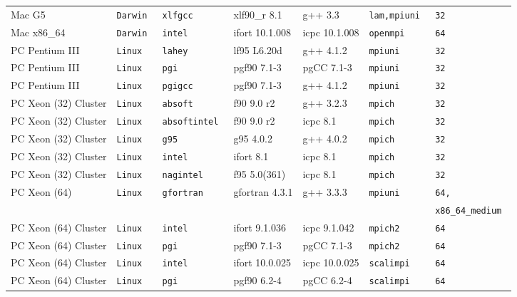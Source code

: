 \begin{tabular}{lllllll}
Mac G5          &\tt Darwin &\tt xlfgcc  & xlf90\_r \footnotesize 8.1& g++ \footnotesize 3.3    &\tt lam,mpiuni &\tt 32 \\
Mac x86\_64      &\tt Darwin &\tt intel   & ifort \footnotesize 10.1.008 & icpc \footnotesize 10.1.008 &\tt openmpi &\tt 64 \\
PC Pentium III  &\tt Linux  &\tt lahey   & lf95 \footnotesize L6.20d & g++ \footnotesize 4.1.2  &\tt mpiuni     &\tt 32 \\
PC Pentium III  &\tt Linux  &\tt pgi     & pgf90 \footnotesize 7.1-3 & pgCC \footnotesize 7.1-3 &\tt mpiuni     &\tt 32 \\
PC Pentium III  &\tt Linux  &\tt pgigcc  & pgf90 \footnotesize 7.1-3 & g++ \footnotesize 4.1.2  &\tt mpiuni     &\tt 32 \\
PC Xeon (32) Cluster &\tt Linux  &\tt absoft & f90 \footnotesize 9.0 r2 & g++ \footnotesize 3.2.3 &\tt mpich      &\tt 32 \\
PC Xeon (32) Cluster &\tt Linux  &\tt absoftintel & f90 \footnotesize 9.0 r2    & icpc \footnotesize 8.1      &\tt mpich     &\tt 32 \\
PC Xeon (32) Cluster &\tt Linux  &\tt g95         & g95 \footnotesize 4.0.2     & g++  \footnotesize 4.0.2    &\tt mpich     &\tt 32 \\
PC Xeon (32) Cluster &\tt Linux  &\tt intel       & ifort \footnotesize 8.1     & icpc \footnotesize 8.1      &\tt mpich     &\tt 32 \\
PC Xeon (32) Cluster &\tt Linux  &\tt nagintel    & f95 \footnotesize 5.0(361)  & icpc \footnotesize 8.1      &\tt mpich     &\tt 32 \\
PC Xeon (64)         &\tt Linux  &\tt gfortran    & gfortran \footnotesize 4.3.1& g++  \footnotesize 3.3.3  &\tt mpiuni &\tt 64, \\
                     &           &                &                             &                           &           &\tt x86\_64\_medium \\
PC Xeon (64) Cluster &\tt Linux  &\tt intel  & ifort \footnotesize 9.1.036  & icpc \footnotesize 9.1.042  &\tt mpich2    &\tt 64 \\
PC Xeon (64) Cluster &\tt Linux  &\tt pgi    & pgf90 \footnotesize 7.1-3    & pgCC \footnotesize 7.1-3    &\tt mpich2    &\tt 64 \\
PC Xeon (64) Cluster &\tt Linux  &\tt intel  & ifort \footnotesize 10.0.025 & icpc \footnotesize 10.0.025 &\tt scalimpi  &\tt 64 \\
PC Xeon (64) Cluster &\tt Linux  &\tt pgi    & pgf90 \footnotesize 6.2-4    & pgCC \footnotesize 6.2-4    &\tt scalimpi  &\tt 64 \\

\end{tabular}
